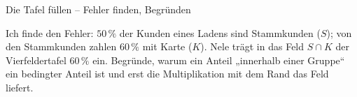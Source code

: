 \begin{aufgabe}{Die Tafel füllen – Fehler finden, Begründen}
\begin{teile}
\teil Ich finde den Fehler: $50\,\%$ der Kunden eines Ladens sind Stammkunden ($S$); von den Stammkunden zahlen $60\,\%$ mit Karte ($K$). Nele trägt in das Feld $S \cap K$ der Vierfeldertafel $60\,\%$ ein.
\teil Begründe, warum ein Anteil „innerhalb einer Gruppe“ ein bedingter Anteil ist und erst die Multiplikation mit dem Rand das Feld liefert.
\end{teile}
\end{aufgabe}
